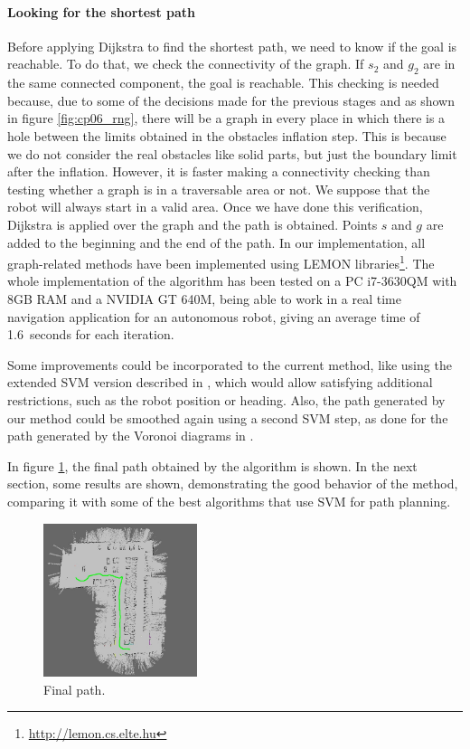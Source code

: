 \paragraph{Looking for the shortest path}\label{ch:chapter06_01_02_04_02}

Before applying Dijkstra to find the shortest path, we need to know if the goal is reachable. To do that, we check the connectivity of the graph. If $s_2$ and $g_2$ are in the same connected component, the goal is reachable. This checking is needed because, due to some of the decisions made for the previous stages and as shown in figure \ref{fig:cp06_rng}, there will be a graph in every place in which there is a hole between the limits obtained in the obstacles inflation step. This is because we do not consider the real obstacles like solid parts, but just the boundary limit after the inflation. However, it is faster making a connectivity checking than testing whether a graph is in a traversable area or not. We suppose that the robot will always start in a valid area.
Once we have done this verification, Dijkstra is applied over the graph and the path is obtained. Points $s$ and $g$ are added to the beginning and the end of the path. In our implementation, all graph-related methods have been implemented using LEMON libraries\footnote{\url{http://lemon.cs.elte.hu}}. The whole implementation of the algorithm has been tested on a PC i7-3630QM with 8GB RAM and a NVIDIA GT 640M, being able to work in a real time navigation application for an autonomous robot, giving an average time of 1.6\ seconds for each iteration.

Some improvements could be incorporated to the current method, like using the extended \ac{SVM} version described in \cite{qingyang2012local}, which would allow satisfying additional restrictions, such as the robot position or heading. Also, the path generated by our method could be smoothed again using a second \ac{SVM} step, as done for the path generated by the Voronoi diagrams in \cite{yang2012safe}.

In figure \ref{fig:cp06_final_path}, the final path obtained by the algorithm is shown. In the next section, some results are shown, demonstrating the good behavior of the method, comparing it with some of the best algorithms that use \ac{SVM} for path planning.

\begin{figure}[h!]
  \centering
  \includegraphics[width=0.4\textwidth, trim=0 0 0 0,clip]{figure7}
  \caption{Final path.}
  \label{fig:cp06_final_path}
\end{figure}


